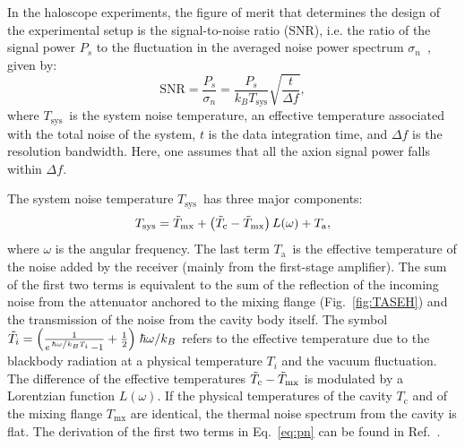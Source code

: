 \documentclass[%
 reprint,prl, %
superscriptaddress,
nobibnotes,
 amsmath,amssymb,
 aps,
]{revtex4-2}
\newcommand{\tsys}{\ensuremath{T_\text{sys}}}
\newcommand{\ta}{\ensuremath{T_\text{a}}}
\begin{document}
In the haloscope experiments, the figure of merit that determines the design 
of the experimental setup is the signal-to-noise ratio
(SNR), i.e. the ratio of the signal power $P_s$ to the fluctuation in 
the averaged noise power spectrum $\sigma_n$~\cite{Dicke}, given by:  
\begin{equation}
   \text{SNR}  =  \frac{P_s}{\sigma_n}=  \frac{P_s}{k_B\tsys}\sqrt{\frac{t}{\Delta f}},
 \label{eq:SNR}
\end{equation}  
where \tsys\ is the system noise temperature, an effective 
temperature associated with the total noise of the system, 
$t$ is the data integration time, and $\Delta f$ is the resolution bandwidth. 
Here, one assumes that all the axion signal power falls within $\Delta f$.  


The system noise temperature \tsys\ has three major components:
\begin{equation}
 \tsys = \Tilde{T}_\text{mx} + \left(\Tilde{T}_\text{c}-\Tilde{T}_\text{mx}\right)L(\omega) + \ta,
\label{eq:pn}
\end{equation}
where $\omega$ is the angular frequency.
The last term \ta\ is the effective temperature of the
noise added by the receiver (mainly from the first-stage amplifier).
The sum of the first two terms is equivalent 
to the sum of the reflection of the incoming noise from
the attenuator anchored to the mixing flange (Fig.~\ref{fig:TASEH}) 
and the transmission of the noise from the cavity body itself.
The symbol 
$\Tilde{T}_i=\left(\frac{1}{e^{\left.\hbar\omega\middle/k_BT_i\right.}-1} + \frac{1}{2}\right)\left. \hbar\omega\middle/k_B\right.$ refers to
the effective temperature due to
the blackbody radiation at a physical temperature $T_i$ and
the vacuum fluctuation.
The difference
of the effective temperatures $\Tilde{T}_\text{c}-\Tilde{T}_\text{mx}$ is
modulated by a Lorentzian function $L(\omega)$. 
If the physical temperatures of the cavity $T_\text{c}$ and of 
the mixing flange $T_\text{mx}$ 
are identical, the thermal noise spectrum from the cavity is flat. 
The derivation of the first two terms in Eq.~\eqref{eq:pn} can be found in
Ref.~\cite{TASEHAnalysis}. 
\end{document}
